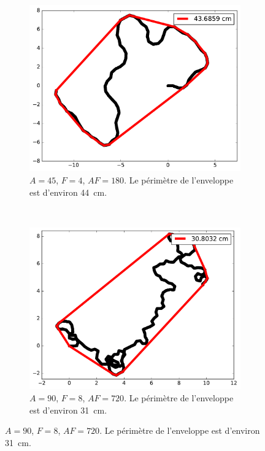 \begin{figure}[htb]
		~
		\begin{subfigure}[t]{\subImgWarea}
			\centering
			\includegraphics[width=\textwidth]{figures/ch3/areaTraj_2_19_45_4}
			\caption{$A = 45$, $F=4$, $AF=180$. Le périmètre de l'enveloppe est d'environ 44~cm.}
			\label{fig:areaTraj_2_19_45_4}
		\end{subfigure}
		~
		\begin{subfigure}[t]{\subImgWarea}
			\centering
			\includegraphics[width=\textwidth]{figures/ch3/areaTraj_2_19_90_8}
			\caption{$A = 90$, $F=8$, $AF=720$. Le périmètre de l'enveloppe est d'environ 31~cm.}
			\label{fig:areaTraj_2_19_90_8}
		\end{subfigure}

\end{figure}
